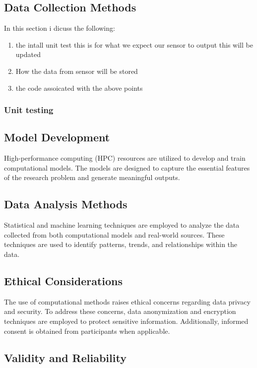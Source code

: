 \subsection{Data Collection Methods}
In this section  i dicuss the  following:
\begin{enumerate}
    \item the  intall  unit test this is for  what we  expect  our  sensor  to  output this  will  be  updated
    \item How  the data  from sensor will be stored 
    \item the code  assoicated   with the above points 
\end{enumerate}
\subsubsection{Unit testing}


\subsection{Model Development}

High-performance computing (HPC) resources are utilized to develop and train computational models. The models are designed to capture the essential features of the research problem and generate meaningful outputs.

\subsection{Data Analysis Methods}

Statistical and machine learning techniques are employed to analyze the data collected from both computational models and real-world sources. These techniques are used to identify patterns, trends, and relationships within the data.

\subsection{Ethical Considerations}

The use of computational methods raises ethical concerns regarding data privacy and security. To address these concerns, data anonymization and encryption techniques are employed to protect sensitive information. Additionally, informed consent is obtained from participants when applicable.

\subsection{Validity and Reliability}


